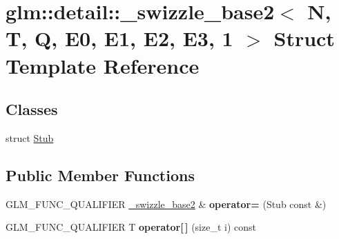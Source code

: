 \hypertarget{structglm_1_1detail_1_1__swizzle__base2_3_01N_00_01T_00_01Q_00_01E0_00_01E1_00_01E2_00_01E3_00_011_01_4}{}\section{glm\+:\+:detail\+:\+:\+\_\+swizzle\+\_\+base2$<$ N, T, Q, E0, E1, E2, E3, 1 $>$ Struct Template Reference}
\label{structglm_1_1detail_1_1__swizzle__base2_3_01N_00_01T_00_01Q_00_01E0_00_01E1_00_01E2_00_01E3_00_011_01_4}
\subsection*{Classes}
\begin{DoxyCompactItemize}
\item 
struct \hyperlink{structglm_1_1detail_1_1__swizzle__base2_3_01N_00_01T_00_01Q_00_01E0_00_01E1_00_01E2_00_01E3_00_011_01_4_d8/d97/structglm_1_1detail_1_1__swizzle__base2_3_01N_00_01T_00_01Q_00_01E0_00_01E1_00_01E2_00_01E3_00_011_01_4_1_1Stub}{Stub}
\end{DoxyCompactItemize}
\subsection*{Public Member Functions}
\begin{DoxyCompactItemize}
\item 
\mbox{\label{structglm_1_1detail_1_1__swizzle__base2_3_01N_00_01T_00_01Q_00_01E0_00_01E1_00_01E2_00_01E3_00_011_01_4_ac03f20f08c7f9d891981cd889dc226f8}} 
G\+L\+M\+\_\+\+F\+U\+N\+C\+\_\+\+Q\+U\+A\+L\+I\+F\+I\+ER \hyperlink{structglm_1_1detail_1_1__swizzle__base2}{\+\_\+swizzle\+\_\+base2} \& {\bfseries operator=} (Stub const \&)
\item 
\mbox{\label{structglm_1_1detail_1_1__swizzle__base2_3_01N_00_01T_00_01Q_00_01E0_00_01E1_00_01E2_00_01E3_00_011_01_4_a991d5b0234288e6751481164111e2a92}} 
G\+L\+M\+\_\+\+F\+U\+N\+C\+\_\+\+Q\+U\+A\+L\+I\+F\+I\+ER T {\bfseries operator\mbox{[}$\,$\mbox{]}} (size\+\_\+t i) const
\end{DoxyCompactItemize}
